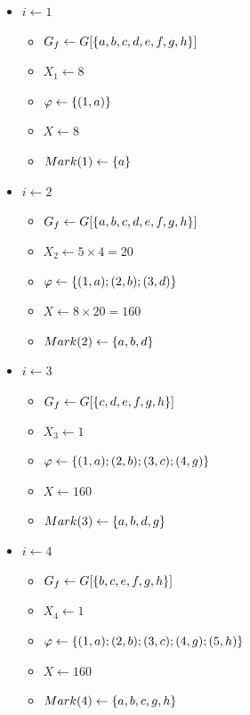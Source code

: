 \documentclass[a4paper,english,12pt,]{scrartcl}
\renewcommand{\phi}{\varphi}
\begin{document}
\begin{multicols}{2}
\footnotesize
\begin{itemize}
 \item $i\leftarrow 1$
    \begin{itemize}
      \item $G_f \leftarrow G[\{a,b,c,d,e,f,g,h\}]$
      \item $X_1 \leftarrow 8$
      \item $\phi \leftarrow \mset{(1,a)}$
      \item $X \leftarrow 8$
      \item $Mark(1) \leftarrow \{a\}$
    \end{itemize}

 \item $i\leftarrow 2$
  \begin{itemize}
      \item $G_f \leftarrow G[\{a,b,c,d,e,f,g,h\}]$
      \item $X_2 \leftarrow 5\times 4 = 20$
      \item $\phi \leftarrow \mset{(1,a);(2,b);(3,d)}$
      \item $X \leftarrow 8\times 20 = 160$
      \item $Mark(2) \leftarrow \{a,b,d\}$
    \end{itemize}


 \item $i\leftarrow 3$
  \begin{itemize}
      \item $G_f \leftarrow G[\{c,d,e,f,g,h\}]$
      \item $X_3 \leftarrow 1$
      \item $\phi \leftarrow \mset{(1,a);(2,b);(3,c);(4,g)}$
      \item $X \leftarrow 160$
      \item $Mark(3) \leftarrow \{a,b,d,g\}$
    \end{itemize}

 \item $i\leftarrow 4$
  \begin{itemize}
      \item $G_f \leftarrow G[\{b,c,e,f,g,h\}]$
      \item $X_4 \leftarrow 1$
      \item $\phi \leftarrow \mset{(1,a);(2,b);(3,c);(4,g);(5,h)}$
      \item $X \leftarrow 160$
      \item $Mark(4) \leftarrow \{a,b,c,g,h\}$
    \end{itemize}

\end{itemize}
\end{multicols}
\end{document}
